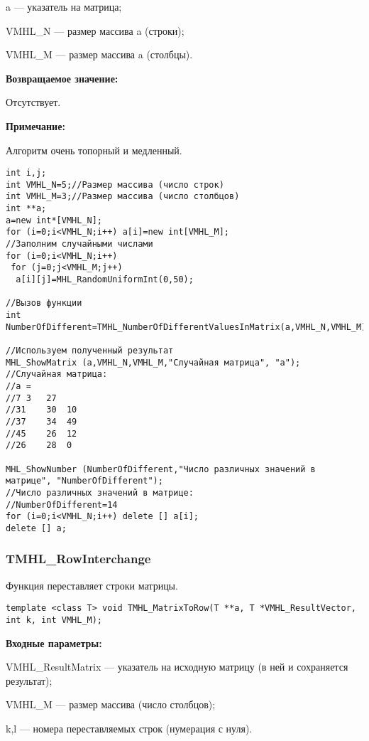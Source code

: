 \documentclass[a4paper,12pt]{article}
\begin{document}
a --- указатель на матрица;
 
VMHL\_N --- размер массива a (строки);
 
VMHL\_M --- размер массива a (столбцы).

\textbf{Возвращаемое значение:}

Отсутствует.

\textbf{Примечание:}

 Алгоритм очень топорный и медленный.


\begin{lstlisting}[label=code_use_TMHL_NumberOfDifferentValuesInMatrix,caption=Пример использования]
int i,j;
int VMHL_N=5;//Размер массива (число строк)
int VMHL_M=3;//Размер массива (число столбцов)
int **a;
a=new int*[VMHL_N];
for (i=0;i<VMHL_N;i++) a[i]=new int[VMHL_M];
//Заполним случайными числами
for (i=0;i<VMHL_N;i++)
 for (j=0;j<VMHL_M;j++)
  a[i][j]=MHL_RandomUniformInt(0,50);

//Вызов функции
int NumberOfDifferent=TMHL_NumberOfDifferentValuesInMatrix(a,VMHL_N,VMHL_M);

//Используем полученный результат
MHL_ShowMatrix (a,VMHL_N,VMHL_M,"Случайная матрица", "a");
//Случайная матрица:
//a =
//7	3	27
//31	30	10
//37	34	49
//45	26	12
//26	28	0

MHL_ShowNumber (NumberOfDifferent,"Число различных значений в матрице", "NumberOfDifferent");
//Число различных значений в матрице:
//NumberOfDifferent=14
for (i=0;i<VMHL_N;i++) delete [] a[i];
delete [] a;
\end{lstlisting}

\subsubsection{TMHL\_RowInterchange}\label{TMHL_RowInterchange}

Функция переставляет строки матрицы.


\begin{lstlisting}[label=code_syntax_TMHL_RowInterchange,caption=Синтаксис]
template <class T> void TMHL_MatrixToRow(T **a, T *VMHL_ResultVector, int k, int VMHL_M);
\end{lstlisting}

\textbf{Входные параметры:}  
 
VMHL\_ResultMatrix --- указатель на исходную матрицу (в ней и сохраняется результат);
 
VMHL\_M --- размер массива (число столбцов);
 
k,l --- номера переставляемых строк (нумерация с нуля).
\end{document}
